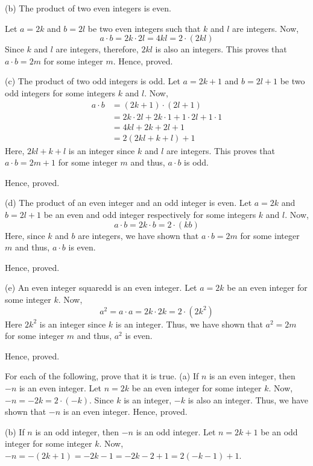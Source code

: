 	(b) The product of two even integers is even.

	\bs
		Let $a = 2k$ and $b = 2l$ be two even integers such that $k$ and $l$ are integers. Now, 
		$$a \cdot b = 2k \cdot 2l = 4kl = 2 \cdot ( 2kl )$$
		Since $k$ and $l$ are integers, therefore, $2kl$ is also an integers. This proves that $a \cdot b = 2m$ for some integer $m$. 
		Hence, proved.
	\es

	(c) The product of two odd integers is odd.
	\bs
		Let $a = 2k+1$ and $b = 2l+1$ be two odd integers for some integers $k$ and $l$. Now,
		\begin{align}
			a \cdot b &= (2k+1) \cdot (2l + 1) \\
								&= 2k \cdot 2l + 2k \cdot 1 + 1 \cdot 2l + 1 \cdot 1 \\
								&= 4kl + 2k + 2l + 1 \\
								&= 2(2kl + k + l) + 1
		\end{align}
		Here, $2kl+k+l$ is an integer since $k$ and $l$ are integers. This proves that $a \cdot b = 2m+1$ for some integer $m$ and thus, $a \cdot b$ is odd.

		Hence, proved.
	\es

	(d) The product of an even integer and an odd integer is even.
	\bs
		Let $a = 2k$ and $b = 2l+1$ be an even and odd integer respectively for some integers $k$ and $l$. Now,
		$$ a \cdot b = 2k \cdot b = 2 \cdot (kb)$$
		Here, since $k$ and $b$ are integers, we have shown that $a \cdot b = 2m$ for some integer $m$ and thus, $a \cdot b$ is even.

		Hence, proved.
	\es
	
	(e) An even integer squaredd is an even integer.
	\bs
		Let $a = 2k$ be an even integer for some integer $k$. Now,
		$$a^2 = a \cdot a = 2k \cdot 2k = 2 \cdot (2k^2)$$
		Here $2k^2$ is an integer since $k$ is an integer. Thus, we have shown that $a^2 = 2m$ for some integer $m$ and thus, $a^2$ is even.

		Hence, proved.
	\es

\ep 


\bp 
	For each of the following, prove that it is true.
	\bigbreak
	(a) If $n$ is an even integer, then $-n$ is an even integer.
	\bs
		Let $n = 2k$ be an even integer for some integer $k$. Now, $-n = -2k = 2 \cdot (-k)$. Since $k$ is an integer, $-k$ is also an integer. Thus, we have shown that $-n$ is an even integer. Hence, proved.
	\es

	(b) If $n$ is an odd integer, then $-n$ is an odd integer.
	\bs
		Let $n = 2k+1$ be an odd integer for some integer $k$. Now, $-n = -(2k+1) =-2k-1 = -2k-2+1 = 2(-k-1) + 1$.

